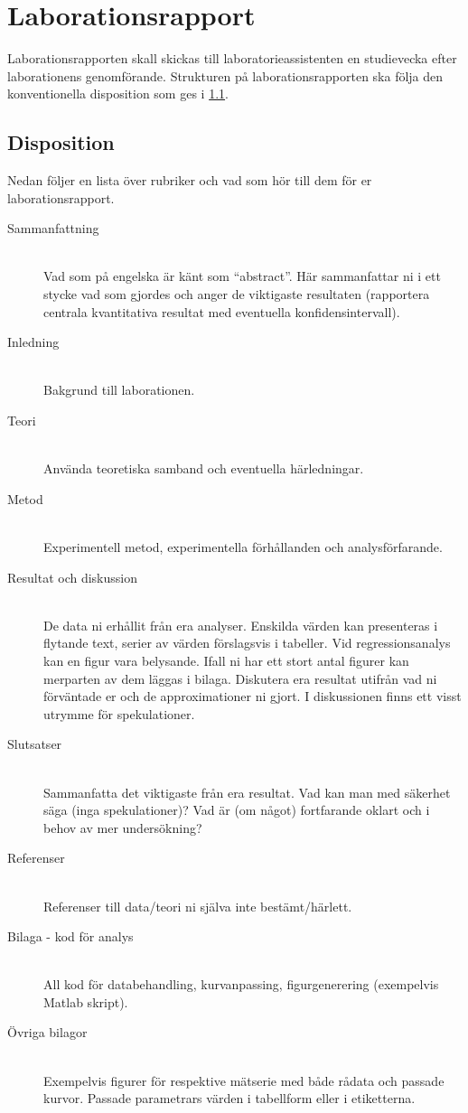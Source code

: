 \section{Laborationsrapport}
\label{sec:rapport}
Laborationsrapporten skall skickas till laboratorieassistenten en
studievecka efter laborationens genomförande. Strukturen på
laborationsrapporten ska följa den konventionella disposition som ges i 
\cref{sec:rapport-disposition}.

\subsection{Disposition}
\label{sec:rapport-disposition}
Nedan följer en lista över rubriker och vad som hör till dem för er
laborationsrapport. 
\begin{description}
  \item[Sammanfattning] \hfill \\
    Vad som på engelska är känt som ``abstract''. Här sammanfattar ni i
    ett stycke vad som gjordes och anger de viktigaste resultaten
    (rapportera centrala kvantitativa resultat med eventuella
    konfidensintervall).
  \item[Inledning] \hfill \\ 
    Bakgrund till laborationen.
  \item[Teori] \hfill \\ 
    Använda teoretiska samband och eventuella härledningar.
  \item[Metod] \hfill \\ 
    Experimentell metod, experimentella förhållanden och analysförfarande.
  \item[Resultat och diskussion] \hfill \\ 
    De data ni erhållit från era analyser. Enskilda värden kan
    presenteras i flytande text, serier av värden förslagsvis i tabeller.
    Vid regressionsanalys kan en figur vara belysande. Ifall ni har
    ett stort antal figurer kan merparten av dem läggas i
    bilaga. Diskutera era resultat utifrån vad ni förväntade er och de
    approximationer ni gjort. I diskussionen finns ett visst utrymme för
    spekulationer.
  \item[Slutsatser] \hfill \\ 
    Sammanfatta det viktigaste från era resultat. Vad kan man med säkerhet
    säga (inga spekulationer)? Vad är (om något) fortfarande oklart och i
    behov av mer undersökning?
  \item[Referenser] \hfill \\
    Referenser till data/teori ni själva inte bestämt/härlett.
  \item[Bilaga - kod för analys] \hfill \\
    All kod för databehandling, kurvanpassing, figurgenerering (exempelvis
    Matlab skript).
  \item[Övriga bilagor] \hfill \\
    Exempelvis figurer för respektive mätserie med både rådata och
    passade kurvor. Passade parametrars värden i tabellform eller i
    etiketterna.
\end{description}

